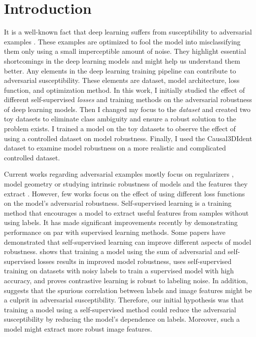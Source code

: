 \documentclass[../thesis.tex]{subfiles}
\begin{document}
\section{Introduction}

	It is a well-known fact that deep learning suffers from susceptibility to adversarial examples \cite{adv_exp_original_paper}. These examples are optimized to fool the model into misclassifying them only using a small imperceptible amount of noise. They highlight essential shortcomings in the deep learning models and might help us understand them better. Any elements in the deep learning training pipeline can contribute to adversarial susceptibility. These elements are dataset, model architecture, loss function, and optimization method. In this work, I initially studied the effect of different self-supervised \textit{losses} and training methods on the adversarial robustness of deep learning models. Then I changed my focus to the \textit{dataset} and created two toy datasets to eliminate class ambiguity and ensure a robust solution to the problem exists. I trained a model on the toy datasets to observe the effect of using a controlled dataset on model robustness. Finally, I used the Causal3DIdent dataset \cite{3dident} to examine model robustness on a more realistic and complicated controlled dataset.   
	
	Current works regarding adversarial examples mostly focus on regularizers \cite{grad_align}, model geometry \cite{cure} or studying intrinsic robustness of  models and the features they extract \cite{features_not_bugs_madry}. However, few works focus on the effect of using different loss functions on the model's adversarial robustness. Self-supervised learning is a training method that encourages a model to extract useful features from samples without using labels. It has made significant improvements recently \cite{simclr_chen_simple_2020} by demonstrating performance on par with supervised learning methods. Some papers have demonstrated that self-supervised learning can improve different aspects of model robustness. \cite{adv_training_plus_ssl_training} shows that training a model using the sum of adversarial and self-supervised losses results in improved model robustness, \cite{contrast_to_divide} uses self-supervised training on datasets with noisy labels to train a supervised model with high accuracy, and \cite{label_noise_contrastive_learning} proves contrastive learning is robust to labeling noise. In addition, \cite{features_not_bugs_madry} suggests that the spurious correlation between labels and image features might be a culprit in adversarial susceptibility. Therefore, our initial hypothesis was that training a model using a self-supervised method could reduce the adversarial susceptibility by reducing the model's dependence on labels. Moreover, such a model might extract more robust image features. 
	
\end{document}
